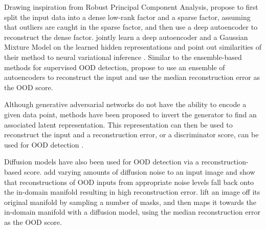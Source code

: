 Drawing inspiration from Robust Principal Component Analysis, \textcite{zhou_anomaly_2017} propose to first split the input data into a dense low-rank factor and a sparse factor, assuming that outliers are caught in the sparse factor, and then use a deep autoencoder to reconstruct the dense factor. 
\textcite{zong_deep_2018} jointly learn a deep autoencoder and a Gaussian Mixture Model on the learned hidden representations and point out similarities of their method to neural variational inference \parencite{mnih_neural_2014}. 
Similar to the ensemble-based methods for supervised OOD detection, \textcite{chen_outlier_2017} propose to use an ensemble of autoencoders to reconstruct the input and use the median reconstruction error as the OOD score. 

Although generative adversarial networks do not have the ability to encode a given data point, methods have been proposed to invert the generator to find an associated latent representation. This representation can then be used to reconstruct the input and a reconstruction error, or a discriminator score, can be used for OOD detection \parencite{schlegl_unsupervised_2017,li_madgan_2019}. 

Diffusion models have also been used for OOD detection via a reconstruction-based score. \textcite{graham_denoising_2023} add varying amounts of diffusion noise to an input image and show that reconstructions of OOD inputs from appropriate noise levels fall back onto the in-domain manifold resulting in high reconstruction error. 
\textcite{liu_unsupervised_2023a} lift an image off its original manifold by sampling a number of masks, and then maps it towards the in-domain manifold with a diffusion model, using the median reconstruction error as the OOD score.



